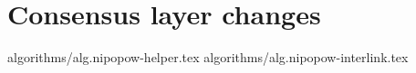 \section{Consensus layer changes}

{algorithms/alg.nipopow-helper.tex}
{algorithms/alg.nipopow-interlink.tex}
